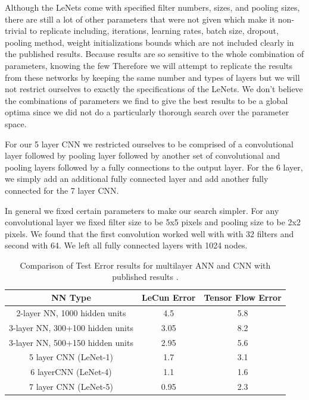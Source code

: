\documentclass[12pt, twocolumn]{article}
\begin{document}
Although the LeNets come with specified filter numbers, sizes, and pooling sizes, there are still a lot of other parameters that were not given which make it non-trivial to replicate including, iterations, learning rates, batch size, dropout, pooling method, weight initializations bounds which are not included clearly in the published results. Because results are so sensitive to the whole combination of parameters, knowing the few  Therefore we will attempt to replicate the results from these networks by keeping the same number and types of layers but we will not restrict ourselves to exactly the specifications of the LeNets. We don't  believe the combinations of parameters we find to give the best results to be a global optima since we did not do a particularly thorough search over the parameter space. 

For our 5 layer CNN we restricted ourselves to be comprised of a convolutional layer followed by pooling layer followed by another set of convolutional and pooling layers followed by a fully connections to the output layer. For the 6 layer, we simply add an additional fully connected layer and add another fully connected for the 7 layer CNN. 


In general we fixed certain parameters to make our search simpler. For any convolutional layer we fixed filter size to be 5x5 pixels and pooling size to be 2x2 pixels. We found that the first convolution worked well with with 32 filters and second with 64.   We left all fully connected layers with 1024 nodes. 



\begin{table}[t]
\begin{center}
\begin{tabular} { |c | c | c | }
    \hline
    NN Type & LeCun Error  &   Tensor Flow Error \\ \hline
    2-layer NN, 1000 hidden units & 4.5  & 5.8\\ \hline
    3-layer NN, 300+100 hidden units & 3.05  & 8.2 \\ \hline
    3-layer NN, 500+150 hidden units & 2.95  & 5.6\\ \hline
    5 layer CNN  (LeNet-1) & 1.7  & 3.1\\ \hline 
    6 layerCNN (LeNet-4) & 1.1 & 1.6\\ \hline 
    7 layer CNN (LeNet-5) &  0.95  & 2.3\\ \hline
\end{tabular}
\label{table: MNISTLeCun}
\caption{Comparison of Test Error results for multilayer ANN and CNN with published results \cite{LeCun1998}.}
\end{center}
\end{table}
\end{document}
